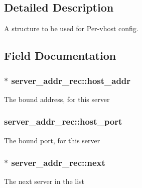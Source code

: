 \subsection{Detailed Description}
A structure to be used for Per-\/vhost config. 

\subsection{Field Documentation}
\subsubsection[{\texorpdfstring{host\+\_\+addr}{host_addr}}]{$\ast$ server\+\_\+addr\+\_\+rec\+::host\+\_\+addr}\hypertarget{structserver__addr__rec_ad25f9e42277e5f540f98ad1998d7548b}{}\label{structserver__addr__rec_ad25f9e42277e5f540f98ad1998d7548b}
The bound address, for this server 
\subsubsection[{\texorpdfstring{host\+\_\+port}{host_port}}]{ server\+\_\+addr\+\_\+rec\+::host\+\_\+port}\hypertarget{structserver__addr__rec_a498bb8ff02743204f9c00865a089de9a}{}\label{structserver__addr__rec_a498bb8ff02743204f9c00865a089de9a}
The bound port, for this server 
\subsubsection[{\texorpdfstring{next}{next}}]{$\ast$ server\+\_\+addr\+\_\+rec\+::next}\hypertarget{structserver__addr__rec_a5b8b246fe0879f9f40d0d7492e9ce8e2}{}\label{structserver__addr__rec_a5b8b246fe0879f9f40d0d7492e9ce8e2}
The next server in the list 
